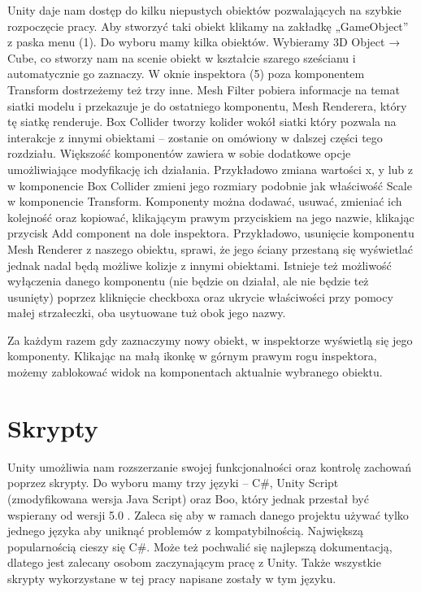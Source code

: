 \documentclass[brudnopis]{xmgr}
\begin{document}
Unity daje nam dostęp do kilku niepustych obiektów pozwalających na szybkie rozpoczęcie pracy. Aby stworzyć taki obiekt klikamy na zakładkę „GameObject” z paska menu (1). Do wyboru mamy kilka obiektów. Wybieramy 3D Object → Cube, co stworzy nam na scenie obiekt w kształcie szarego sześcianu i automatycznie go zaznaczy. W oknie inspektora (5) poza komponentem Transform dostrzeżemy też trzy inne. Mesh Filter pobiera informacje na temat siatki modelu i przekazuje je do ostatniego komponentu, Mesh Renderera, który tę siatkę renderuje. Box Collider tworzy kolider wokół siatki który pozwala na interakcje z innymi obiektami – zostanie on omówiony w dalszej części tego rozdziału. Większość komponentów zawiera w sobie dodatkowe opcje umożliwiające modyfikację ich działania. Przykładowo zmiana wartości x, y  lub z w komponencie Box Collider zmieni jego rozmiary podobnie jak właściwość Scale w komponencie Transform. Komponenty można dodawać, usuwać, zmieniać ich kolejność oraz kopiować, klikającym prawym przyciskiem na jego nazwie, klikając przycisk Add component na dole inspektora. Przykładowo, usunięcie komponentu Mesh Renderer z naszego obiektu, sprawi, że jego ściany przestaną się wyświetlać jednak nadal będą możliwe kolizje z innymi obiektami.
Istnieje też możliwość wyłączenia danego komponentu (nie będzie on działał, ale nie będzie też usunięty) poprzez kliknięcie checkboxa  oraz ukrycie właściwości przy pomocy małej strzałeczki, oba usytuowane tuż obok jego nazwy.

Za każdym razem gdy zaznaczymy nowy obiekt, w inspektorze wyświetlą się jego komponenty. Klikając na małą ikonkę w górnym prawym rogu inspektora, możemy zablokować widok na komponentach aktualnie wybranego obiektu. 

\section{Skrypty}

Unity umożliwia nam rozszerzanie swojej funkcjonalności oraz kontrolę zachowań poprzez skrypty. Do wyboru mamy trzy języki – C\#, Unity Script (zmodyfikowana wersja Java Script) oraz Boo, który jednak przestał być wspierany od wersji 5.0 . Zaleca się aby w ramach danego projektu używać tylko jednego języka aby uniknąć problemów z kompatybilnością.
Największą popularnością cieszy się C\#. Może też pochwalić się najlepszą dokumentacją, dlatego jest zalecany osobom zaczynającym pracę z Unity. Także wszystkie skrypty wykorzystane w tej pracy napisane zostały w tym języku. 
\end{document}
